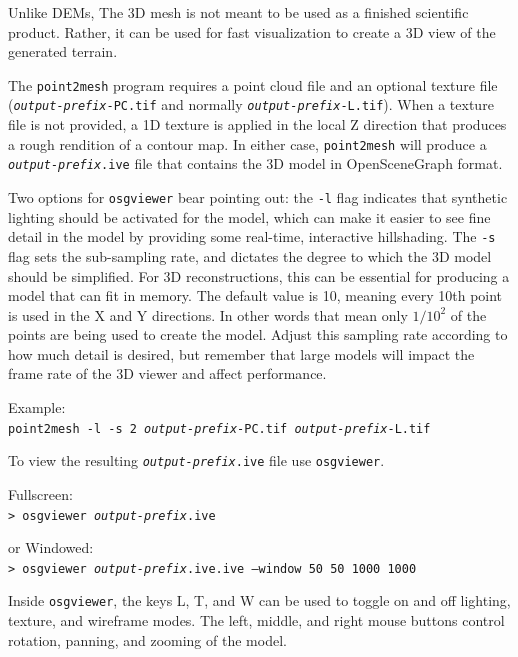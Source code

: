 Unlike \acp{DEM}, The 3D mesh is not meant to be used as a finished
scientific product.  Rather, it can be used for fast visualization
to create a 3D view of the generated terrain.

The \texttt{point2mesh} program requires a point cloud file and an
optional texture file (\texttt{\textit{output-prefix}-PC.tif} and
normally \texttt{\textit{output-prefix}-L.tif}). When a texture
file is not provided, a 1D texture is applied in the local Z direction
that produces a rough rendition of a contour map.  In either case,
\texttt{point2mesh} will produce a \texttt{\textit{output-prefix}.ive}
file that contains the 3D model in OpenSceneGraph format.

Two options for \texttt{osgviewer} bear pointing out: the \texttt{-l}
flag indicates that synthetic lighting should be activated for the
model, which can make it easier to see fine detail in the model by
providing some real-time, interactive hillshading.  The \verb#-s#
flag sets the sub-sampling rate, and dictates the degree to which
the 3D model should be simplified.  For 3D reconstructions, this
can be essential for producing a model that can fit in memory.  The
default value is 10, meaning every 10th point is used in the X and
Y directions. In other words that mean only $1/10^2$ of the points
are being used to create the model. Adjust this sampling rate
according to how much detail is desired, but remember that large
models will impact the frame rate of the 3D viewer and affect
performance.

Example:\\
\hspace*{2em}\texttt{point2mesh -l -s 2 \textit{output-prefix}-PC.tif \textit{output-prefix}-L.tif}

To view the resulting \texttt{\textit{output-prefix}.ive} file use 
\texttt{osgviewer}.

\hspace*{2em}Fullscreen:\\
\hspace*{2em}\texttt{> osgviewer \textit{output-prefix}.ive}

\hspace*{2em}or Windowed:\\
\hspace*{2em}\texttt{> osgviewer \textit{output-prefix}.ive.ive --window 50 50 1000 1000}

Inside \texttt{osgviewer}, the keys L, T, and W can be used to toggle on
and off lighting, texture, and wireframe modes.  The left, middle, and
right mouse buttons control rotation, panning, and zooming of the
model.

